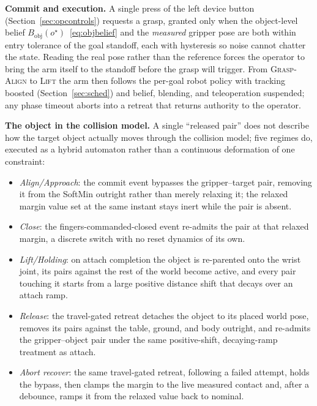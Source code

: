 \textbf{Commit and execution.} A single press of the left device button (Section~\ref{sec:opcontrols}) requests a grasp, granted only when the object-level belief $B_{\text{obj}}(o^{\star})$~\eqref{eq:objbelief} and the \emph{measured} gripper pose are both within entry tolerance of the goal standoff, each with hysteresis so noise cannot chatter the state. Reading the real pose rather than the reference forces the operator to bring the arm itself to the standoff before the grasp will trigger. From \textsc{Grasp-Align} to \textsc{Lift} the arm then follows the per-goal robot policy with tracking boosted (Section~\ref{sec:sched}) and belief, blending, and teleoperation suspended; any phase timeout aborts into a retreat that returns authority to the operator.

\textbf{The object in the collision model.} A single ``released pair'' does not describe how the target object actually moves through the collision model; five regimes do, executed as a hybrid automaton rather than a continuous deformation of one constraint:
\begin{itemize}[nosep]
\item \emph{Align/Approach}: the commit event bypasses the gripper--target pair, removing it from the SoftMin outright rather than merely relaxing it; the relaxed margin value set at the same instant stays inert while the pair is absent.
\item \emph{Close}: the fingers-commanded-closed event re-admits the pair at that relaxed margin, a discrete switch with no reset dynamics of its own.
\item \emph{Lift/Holding}: on attach completion the object is re-parented onto the wrist joint, its pairs against the rest of the world become active, and every pair touching it starts from a large positive distance shift that decays over an attach ramp.
\item \emph{Release}: the travel-gated retreat detaches the object to its placed world pose, removes its pairs against the table, ground, and body outright, and re-admits the gripper--object pair under the same positive-shift, decaying-ramp treatment as attach.
\item \emph{Abort recover}: the same travel-gated retreat, following a failed attempt, holds the bypass, then clamps the margin to the live measured contact and, after a debounce, ramps it from the relaxed value back to nominal.
\end{itemize}


